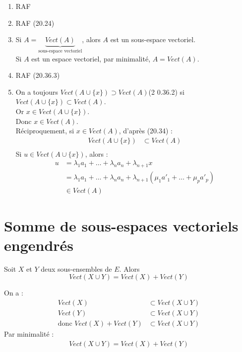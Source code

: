 \documentclass[../main.tex]{subfiles}
\begin{document}
\begin{enumerate}
    \item RAF
    \item RAF (20.24)
    \item Si $A = \underbrace{Vect(A)}_{\text{sous-espace vectoriel}}$, alors $A$ est un sous-espace vectoriel. \\
    Si $A$ est un espace vectoriel, par minimalité, $A = Vect(A)$.
    \item RAF (20.36.3)
    \item On a toujours $Vect(A \cup \{x\}) \supset Vect(A)$(2 0.36.2) si $Vect(A \cup \{x\}) \subset Vect(A)$. \\
    Or $x \in Vect(A \cup \{x\})$. \\
    Donc $x \in Vect(A)$. \\
    Réciproquement, si $x \in Vect(A)$, d'après (20.34) : 
    \begin{align*}
        Vect(A \cup \{x\}) &\subset Vect(A) \\
    \end{align*}
    Si $u \in Vect(A \cup \{x\})$, alors : 
    \begin{align*}
        u &= \lambda_1 a_1 + \ldots + \lambda_n a_n + \lambda_{n+1} x \\
        &= \lambda_1 a_1 + \ldots + \lambda_n a_n + \lambda_{n+1} (\mu_1 a'_1 + \ldots + \mu_p a'_p) \\
        &\in Vect(A)
    \end{align*}
\end{enumerate}

\section{Somme de sous-espaces vectoriels engendrés}
\begin{tcolorbox}[title=Propostion 20.41, title filled=false, colframe=lightblue, colback=lightblue!10!white]
    Soit $X$ et $Y$ deux sous-ensembles de $E$. Alors
    $$Vect(X \cup Y) = Vect(X) + Vect(Y)$$
\end{tcolorbox}

\noindent On a : 
\begin{align*}
    Vect(X) &\subset Vect(X \cup Y) \\
    Vect(Y) &\subset Vect(X \cup Y) \\
    \text{donc } Vect(X) + Vect(Y) &\subset Vect(X \cup Y)
\end{align*}
Par minimalité : 
\begin{align*}
    \boxed{Vect(X \cup Y) = Vect(X) + Vect(Y)}
\end{align*}
\end{document}
